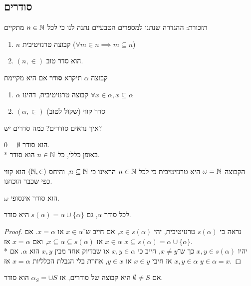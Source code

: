 \subsection{סודרים}
תזכורת: ההגדרה שנתנו למספרים הטבעיים נתנה לנו כי לכל $n \in \mathbb{N}$ מתקיים
\begin{enumerate}
	\item $n$ קבוצה טרנזיטיבית ($\forall m \in n \implies m \subseteq n$)
	\item $(n, \in)$ הוא סדר טוב.
\end{enumerate}
\begin{definition}[סודר]
	קבוצה $\alpha$ תיקרא \textbf{סודר} אם היא מקיימת
	\begin{enumerate}
		\item $\alpha$ קבוצה טרנזיטיבית, דהינו $\forall x \in \alpha, x \subseteq \alpha$
		\item $(\alpha, \in)$ סדר קווי (שקול לטוב)
	\end{enumerate}
\end{definition}
\begin{exercise}
	איך נראים סודרים? כמה סדרים יש?
\end{exercise}
\begin{example}
	$0 = \emptyset$ הוא סודר. \\*
	באופן כללי, כל $n \in \mathbb{N}$ הוא סודר.
\end{example}
\begin{example}
	הקבוצה $\omega = \mathbb{N}$ היא טרנזיטיבית כי לכל $n \in \mathbb{N}$ הראינו כי $n \subseteq \mathbb{N}$, והיחס $(\mathbb{N}, \in)$ הוא קווי כפי שכבר הוכחנו.
\end{example}
\begin{conclusion}
	$\omega$ הוא סודר אינסופי.
\end{conclusion}
\begin{proposition}
	לכל סודר $\alpha$, גם $s(\alpha) = \alpha \cup \{ \alpha \}$ היא סודר.
\end{proposition}
\begin{proof}
	נראה כי $s(\alpha)$ טרנזיטיבית, יהי $x \in s(\alpha)$, אם חייב ש־$x \in \alpha$ או $x = \alpha$.
	אם $x \in \alpha$ אז $x \subseteq \alpha \subseteq s(\alpha)$, ואם $x = \alpha$ אז $x \subseteq s(\alpha) = \alpha \cup \{ \alpha \}$. \\*
	יהיו $x, y \in s(\alpha)$ כך ש־$x \ne y$, חייב כי $x, y \in \alpha$ או שבדיוק אחד מבין $x, y$ הוא $\alpha$.
	אם $x, y \in \alpha$ אז חיבי $x \in y$ או $y \in x$, אחרת בלי הגבלת הכלליות $x = \alpha$ אז $y \in \alpha = x$.
\end{proof}
\begin{proposition}
	אם $\emptyset \ne S$ היא קבוצה של סודרים, אז $\alpha_S = \cup S$ הוא סודר.
\end{proposition}

